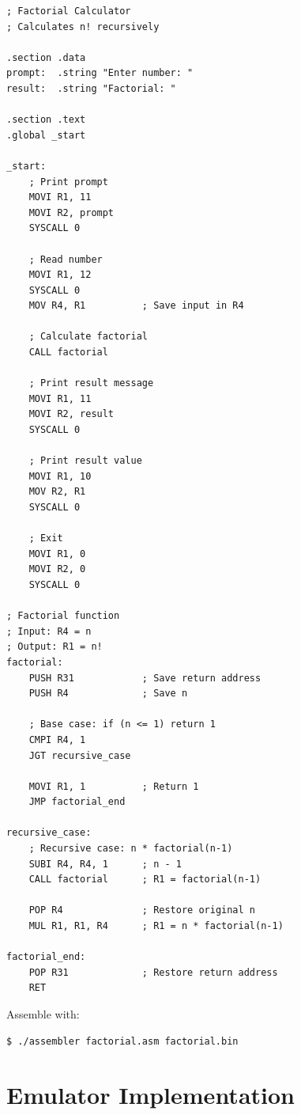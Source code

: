 \documentclass[12pt,a4paper,oneside]{book}
\begin{document}
\begin{lstlisting}[style=assembly, caption={Complete Assembly Program}]
; Factorial Calculator
; Calculates n! recursively

.section .data
prompt:  .string "Enter number: "
result:  .string "Factorial: "

.section .text
.global _start

_start:
    ; Print prompt
    MOVI R1, 11
    MOVI R2, prompt
    SYSCALL 0
    
    ; Read number
    MOVI R1, 12
    SYSCALL 0
    MOV R4, R1          ; Save input in R4
    
    ; Calculate factorial
    CALL factorial
    
    ; Print result message
    MOVI R1, 11
    MOVI R2, result
    SYSCALL 0
    
    ; Print result value
    MOVI R1, 10
    MOV R2, R1
    SYSCALL 0
    
    ; Exit
    MOVI R1, 0
    MOVI R2, 0
    SYSCALL 0

; Factorial function
; Input: R4 = n
; Output: R1 = n!
factorial:
    PUSH R31            ; Save return address
    PUSH R4             ; Save n
    
    ; Base case: if (n <= 1) return 1
    CMPI R4, 1
    JGT recursive_case
    
    MOVI R1, 1          ; Return 1
    JMP factorial_end
    
recursive_case:
    ; Recursive case: n * factorial(n-1)
    SUBI R4, R4, 1      ; n - 1
    CALL factorial      ; R1 = factorial(n-1)
    
    POP R4              ; Restore original n
    MUL R1, R1, R4      ; R1 = n * factorial(n-1)
    
factorial_end:
    POP R31             ; Restore return address
    RET
\end{lstlisting}

Assemble with:
\begin{verbatim}
$ ./assembler factorial.asm factorial.bin
\end{verbatim}

\part{Emulator Implementation}
\end{document}
